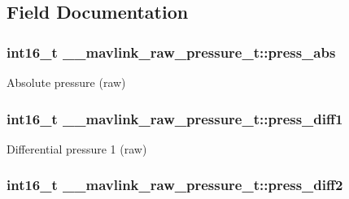 \subsection{Field Documentation}
\hypertarget{struct____mavlink__raw__pressure__t_aab16fd5b27c766d69df4ffa252d573e3}{
\subsubsection[{press\+\_\+abs}]{\setlength{\rightskip}{0pt plus 5cm}int16\+\_\+t \+\_\+\+\_\+mavlink\+\_\+raw\+\_\+pressure\+\_\+t\+::press\+\_\+abs}}\label{struct____mavlink__raw__pressure__t_aab16fd5b27c766d69df4ffa252d573e3}


Absolute pressure (raw) 

\hypertarget{struct____mavlink__raw__pressure__t_ae53766b9335fa7900b3a72daca467b70}{
\subsubsection[{press\+\_\+diff1}]{\setlength{\rightskip}{0pt plus 5cm}int16\+\_\+t \+\_\+\+\_\+mavlink\+\_\+raw\+\_\+pressure\+\_\+t\+::press\+\_\+diff1}}\label{struct____mavlink__raw__pressure__t_ae53766b9335fa7900b3a72daca467b70}


Differential pressure 1 (raw) 

\hypertarget{struct____mavlink__raw__pressure__t_a7b832c03aaa2a3f55e309d590d9fc93b}{
\subsubsection[{press\+\_\+diff2}]{\setlength{\rightskip}{0pt plus 5cm}int16\+\_\+t \+\_\+\+\_\+mavlink\+\_\+raw\+\_\+pressure\+\_\+t\+::press\+\_\+diff2}}\label{struct____mavlink__raw__pressure__t_a7b832c03aaa2a3f55e309d590d9fc93b}



